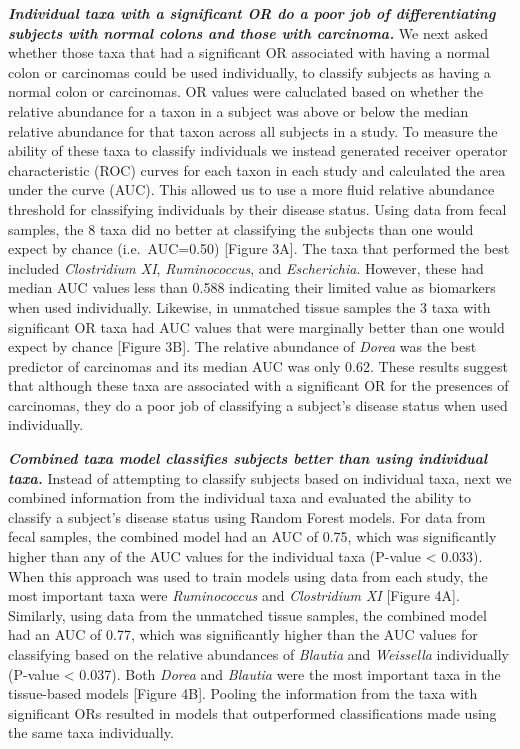 \documentclass[12pt,]{article}
\begin{document}
\textbf{\emph{Individual taxa with a significant OR do a poor job of
differentiating subjects with normal colons and those with carcinoma.}}
We next asked whether those taxa that had a significant OR associated
with having a normal colon or carcinomas could be used individually, to
classify subjects as having a normal colon or carcinomas. OR values were
caluclated based on whether the relative abundance for a taxon in a
subject was above or below the median relative abundance for that taxon
across all subjects in a study. To measure the ability of these taxa to
classify individuals we instead generated receiver operator
characteristic (ROC) curves for each taxon in each study and calculated
the area under the curve (AUC). This allowed us to use a more fluid
relative abundance threshold for classifying individuals by their
disease status. Using data from fecal samples, the 8 taxa did no better
at classifying the subjects than one would expect by chance
(i.e.~AUC=0.50) {[}Figure 3A{]}. The taxa that performed the best
included \emph{Clostridium XI}, \emph{Ruminococcus}, and
\emph{Escherichia}. However, these had median AUC values less than 0.588
indicating their limited value as biomarkers when used individually.
Likewise, in unmatched tissue samples the 3 taxa with significant OR
taxa had AUC values that were marginally better than one would expect by
chance {[}Figure 3B{]}. The relative abundance of \emph{Dorea} was the
best predictor of carcinomas and its median AUC was only 0.62. These
results suggest that although these taxa are associated with a
significant OR for the presences of carcinomas, they do a poor job of
classifying a subject's disease status when used individually.

\textbf{\emph{Combined taxa model classifies subjects better than using
individual taxa.}} Instead of attempting to classify subjects based on
individual taxa, next we combined information from the individual taxa
and evaluated the ability to classify a subject's disease status using
Random Forest models. For data from fecal samples, the combined model
had an AUC of 0.75, which was significantly higher than any of the AUC
values for the individual taxa (P-value \textless{} 0.033). When this
approach was used to train models using data from each study, the most
important taxa were \emph{Ruminococcus} and \emph{Clostridium XI}
{[}Figure 4A{]}. Similarly, using data from the unmatched tissue
samples, the combined model had an AUC of 0.77, which was significantly
higher than the AUC values for classifying based on the relative
abundances of \emph{Blautia} and \emph{Weissella} individually (P-value
\textless{} 0.037). Both \emph{Dorea} and \emph{Blautia} were the most
important taxa in the tissue-based models {[}Figure 4B{]}. Pooling the
information from the taxa with significant ORs resulted in models that
outperformed classifications made using the same taxa individually.
\end{document}
